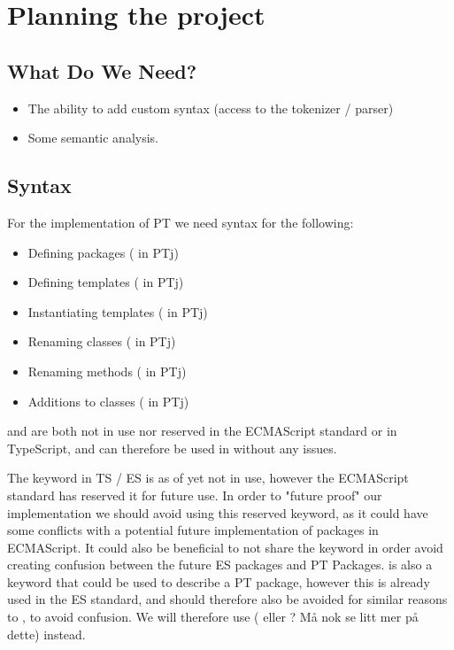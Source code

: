 
\chapter{Planning the project}\label{ch:planning-the-project}

\section{What Do We Need?}\label{sec:what-do-we-need}

\begin{itemize}
    \item The ability to add custom syntax (access to the tokenizer / parser)
    \item Some semantic analysis.
\end{itemize}

\section{Syntax}\label{sec:syntax}

For the implementation of PT we need syntax for the following:

\begin{itemize}
    \item Defining packages ( in PTj)
    \item Defining templates ( in PTj)
    \item Instantiating templates ( in PTj)
    \item Renaming classes (\codeword{=>} in PTj)
    \item Renaming methods (\codeword{->} in PTj)
    \item Additions to classes ( in PTj)
\end{itemize}

 and  are both not in use nor reserved in the ECMAScript standard or in TypeScript, and can therefore be used in \plname{} without any issues.

The keyword  in TS / ES is as of yet not in use, however the ECMAScript standard has reserved it for future use.
In order to "future proof" our implementation we should avoid using this reserved keyword, as it could have some conflicts with a potential future implementation of packages in ECMAScript.
It could also be beneficial to not share the keyword in order avoid creating confusion between the future ES packages and PT Packages.
 is also a keyword that could be used to describe a PT package, however this is already used in the ES standard, and should therefore also be avoided for similar reasons to , to avoid confusion.
We will therefore use ( eller ? Må nok se litt mer på dette) instead. %

